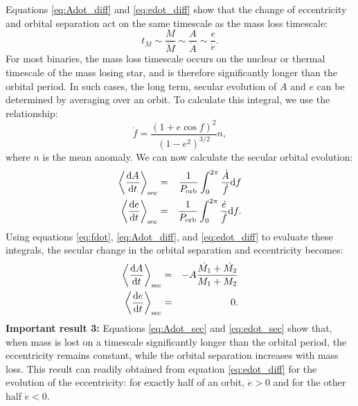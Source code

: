 \documentclass{emulateapj}
\begin{document}
Equations \ref{eq:Adot_diff} and \ref{eq:edot_diff} show that the change of eccentricity and orbital separation act on the same timescale as the mass loss timescale:
\begin{equation}
t_{\dot{M}} \sim \frac{M}{\dot{M}} \sim \frac{A}{\dot{A}} \sim \frac{e}{\dot{e}}.
\end{equation}
For most binaries, the mass loss timescale occurs on the nuclear or thermal timescale of the mass losing star, and is therefore significantly longer than the orbital period. In such cases, the long term, secular evolution of $A$ and $e$ can be determined by averaging over an orbit. To calculate this integral, we use the relationship:
\begin{equation}
\dot{f} = \frac{(1 + e \cos f)^2}{(1-e^2)^{3/2} } n, \label{eq:fdot}
\end{equation}
where $n$ is the mean anomaly. We can now calculate the secular orbital evolution:
\begin{eqnarray}
\left< \frac{{\rm d}A}{{\rm d}t} \right>_{\rm sec} &=& \frac{1}{P_{\rm orb}} \int_0^{2 \pi} \frac{\dot{A}}{\dot{f}} {\rm d}f \\
\left< \frac{{\rm d}e}{{\rm d}t} \right>_{\rm sec} &=& \frac{1}{P_{\rm orb}} \int_0^{2 \pi} \frac{\dot{e}}{\dot{f}} {\rm d}f.
\end{eqnarray}
Using equations \ref{eq:fdot}, \ref{eq:Adot_diff}, and \ref{eq:edot_diff} to evaluate these integrals, the secular change in the orbital separation and eccentricity becomes:
\begin{eqnarray}
\left< \frac{{\rm d}A}{{\rm d}t} \right>_{\rm sec} &=& -A \frac{\dot{M_1} + \dot{M_2}}{M_1 + M_2} \label{eq:Adot_sec} \\
\left< \frac{{\rm d}e}{{\rm d}t} \right>_{\rm sec} &=& 0. \label{eq:edot_sec}
\end{eqnarray}
{\bf Important result 3:} 
Equations \ref{eq:Adot_sec} and \ref{eq:edot_sec} show that, when mass is lost on a timescale significantly longer than the orbital period, the eccentricity remains constant, while the orbital separation increases with mass loss. This result can readily obtained from equation \ref{eq:edot_diff} for the evolution of the eccentricity: for exactly half of an orbit, $\dot{e}>0$ and for the other half $\dot{e}<0$.
\end{document}
